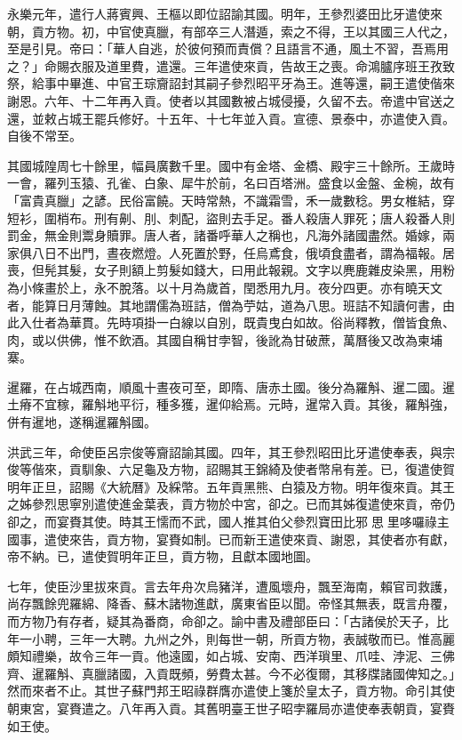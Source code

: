 \begin{pinyinscope}
永樂元年，遣行人蔣賓興、王樞以即位詔諭其國。明年，王參烈婆田比牙遣使來朝，貢方物。初，中官使真臘，有部卒三人潛遁，索之不得，王以其國三人代之，至是引見。帝曰：「華人自逃，於彼何預而責償？且語言不通，風土不習，吾焉用之？」命賜衣服及道里費，遣還。三年遣使來貢，告故王之喪。命鴻臚序班王孜致祭，給事中畢進、中官王琮齎詔封其嗣子參烈昭平牙為王。進等還，嗣王遣使偕來謝恩。六年、十二年再入貢。使者以其國數被占城侵擾，久留不去。帝遣中官送之還，並敕占城王罷兵修好。十五年、十七年並入貢。宣德、景泰中，亦遣使入貢。自後不常至。

其國城隍周七十餘里，幅員廣數千里。國中有金塔、金橋、殿宇三十餘所。王歲時一會，羅列玉猿、孔雀、白象、犀牛於前，名曰百塔洲。盛食以金盤、金椀，故有「富貴真臘」之諺。民俗富饒。天時常熱，不識霜雪，禾一歲數稔。男女椎結，穿短衫，圍梢布。刑有劓、刖、刺配，盜則去手足。番人殺唐人罪死；唐人殺番人則罰金，無金則鬻身贖罪。唐人者，諸番呼華人之稱也，凡海外諸國盡然。婚嫁，兩家俱八日不出門，晝夜燃燈。人死置於野，任烏鳶食，俄頃食盡者，謂為福報。居喪，但髡其髮，女子則額上剪髮如錢大，曰用此報親。文字以麂鹿雜皮染黑，用粉為小條畫於上，永不脫落。以十月為歲首，閏悉用九月。夜分四更。亦有曉天文者，能算日月薄蝕。其地謂儒為班詰，僧為苧姑，道為八思。班詰不知讀何書，由此入仕者為華貫。先時項掛一白線以自別，既貴曳白如故。俗尚釋教，僧皆食魚、肉，或以供佛，惟不飲酒。其國自稱甘孛智，後訛為甘破蔗，萬曆後又改為柬埔寨。

暹羅，在占城西南，順風十晝夜可至，即隋、唐赤土國。後分為羅斛、暹二國。暹土瘠不宜稼，羅斛地平衍，種多獲，暹仰給焉。元時，暹常入貢。其後，羅斛強，併有暹地，遂稱暹羅斛國。

洪武三年，命使臣呂宗俊等齎詔諭其國。四年，其王參烈昭田比牙遣使奉表，與宗俊等偕來，貢馴象、六足龜及方物，詔賜其王錦綺及使者幣帛有差。已，復遣使賀明年正旦，詔賜《大統曆》及綵幣。五年貢黑熊、白猿及方物。明年復來貢。其王之姊參烈思寧別遣使進金葉表，貢方物於中宮，卻之。已而其姊復遣使來貢，帝仍卻之，而宴賚其使。時其王懦而不武，國人推其伯父參烈寶田比邪思里哆囉祿主國事，遣使來告，貢方物，宴賚如制。已而新王遣使來貢、謝恩，其使者亦有獻，帝不納。已，遣使賀明年正旦，貢方物，且獻本國地圖。

七年，使臣沙里拔來貢。言去年舟次烏豬洋，遭風壞舟，飄至海南，賴官司救護，尚存飄餘兜羅綿、降香、蘇木諸物進獻，廣東省臣以聞。帝怪其無表，既言舟覆，而方物乃有存者，疑其為番商，命卻之。諭中書及禮部臣曰：「古諸侯於天子，比年一小聘，三年一大聘。九州之外，則每世一朝，所貢方物，表誠敬而已。惟高麗頗知禮樂，故令三年一貢。他遠國，如占城、安南、西洋瑣里、爪哇、浡泥、三佛齊、暹羅斛、真臘諸國，入貢既頻，勞費太甚。今不必復爾，其移牒諸國俾知之。」然而來者不止。其世子蘇門邦王昭祿群膺亦遣使上箋於皇太子，貢方物。命引其使朝東宮，宴賚遣之。八年再入貢。其舊明臺王世子昭孛羅局亦遣使奉表朝貢，宴賚如王使。


\end{pinyinscope}

